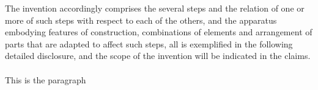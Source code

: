

\npar The invention accordingly comprises the several steps and the relation of one or more of such steps with respect to each of the others, and the apparatus embodying features of construction, combinations of elements and arrangement of parts that are adapted to affect such steps, all is exemplified in the following detailed disclosure, and the scope of the invention will be indicated in the claims.
 
 
 \paragraph{}{\npar \noindent This is the paragraph}
